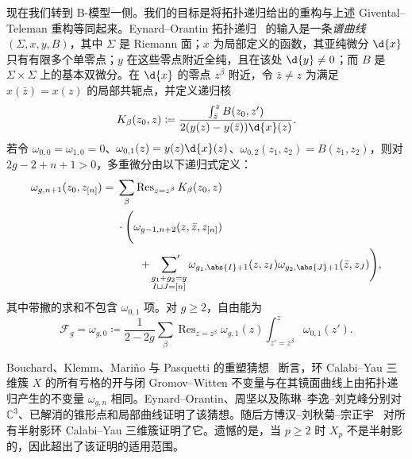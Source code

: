 \documentclass{amsart}
\theoremstyle{definition}
\theoremstyle{remark}
\theoremstyle{plain}
\theoremstyle{definition}
\theoremstyle{remark}
\newcommand{\C}{\mathbb{C}}
\newcommand{\mc}[1]{\mathcal{#1}}
\newcommand{\on}[1]{\operatorname{#1}}
\newcommand{\1}{\mathbf{1}}
\newcommand{\2}{\mathbf{2}}
\newcommand{\3}{\mathbf{3}}
\begin{document}
现在我们转到 B-模型一侧。我们的目标是将拓扑递归给出的重构与上述 Givental--Teleman 重构等同起来。Eynard--Orantin 拓扑递归~\cite{EO2007} 的输入是一条\textit{谱曲线} \((\Sigma,x,y,B)\)，其中 \(\Sigma\) 是 Riemann 面；\(x\) 为局部定义的函数，其亚纯微分 \(\d{x}\) 只有有限多个单零点；\(y\) 在这些零点附近全纯，且在该处 \(\d{y} \neq 0\)；而 \(B\) 是 \(\Sigma \times \Sigma\) 上的基本双微分。在 \(\d{x}\) 的零点 \(z^{\beta}\) 附近，令 \(\bar{z} \neq z\) 为满足 \(x(\bar{z}) = x(z)\) 的局部共轭点，并定义递归核
\[ K_{\beta}(z_0,z) \coloneqq \frac{\int_{\bar{z}}^z B(z_0,z')}{2(y(z)-y(\bar{z}))\d{x}(z)}. \]
若令 \(\omega_{0,0} = \omega_{1,0} = 0\)、\(\omega_{0,1}(z) = y(z)\d{x}(z)\)、\(\omega_{0,2}(z_1,z_2) = B(z_1,z_2)\)，则对 \(2g-2+n+1 > 0\)，多重微分由以下递归式定义：
\begin{align*}
    \omega_{g,n+1}(z_0,z_{[n]}) ={}& \sum_{\beta}\on{Res}_{z = z^{\beta}} K_{\beta}(z_0,z) \\
    &\cdot \Bigg( \omega_{g-1,n+2}(z,\bar{z},z_{[n]}) \\
    &\qquad + \sideset{}{'}\sum_{\substack{g_1+g_2 = g \\ I \sqcup J = [n]}}\omega_{g_1,\abs{I}+1}(z,z_I)\omega_{g_2,\abs{J}+1}(\bar{z},z_J)\Bigg),
\end{align*}
其中带撇的求和不包含 \(\omega_{0,1}\) 项。对 \(g \geq 2\)，自由能为
\[ \mc{F}_g = \omega_{g,0} \coloneqq \frac{1}{2-2g}\sum_{\beta}\on{Res}_{z=z^{\beta}}\omega_{g,1}(z)\int_{z'=z^{\beta}}^z \omega_{0,1}(z'). \]

Bouchard、Klemm、Mari\~{n}o 与 Pasquetti 的重塑猜想~\cite{BKMP2009} 断言，环 Calabi--Yau 三维簇 \(X\) 的所有亏格的开与闭 Gromov--Witten 不变量与在其镜面曲线上由拓扑递归产生的不变量 \(\omega_{g,n}\) 相同。Eynard--Orantin、周坚以及陈琳–李逸–刘克峰分别对 \(\C^3\)、已解消的锥形点和局部曲线证明了该猜想。随后方博汉–刘秋菊–宗正宇~\cite{FLZ2020} 对所有半射影环 Calabi--Yau 三维簇证明了它。遗憾的是，当 \(p \geq 2\) 时 \(X_p\) 不是半射影的，因此超出了该证明的适用范围。
\end{document}
